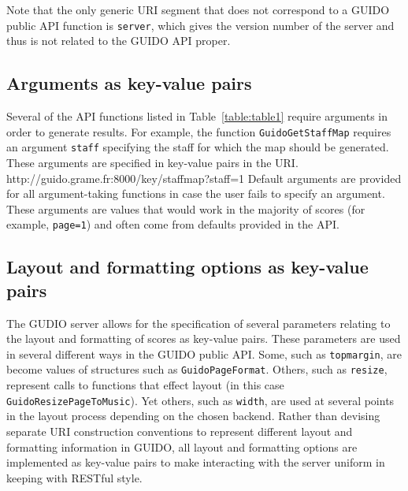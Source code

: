 \documentclass[11pt,a4paper]{article}
\newenvironment{code}		{\vspace{-2mm} \fontsize{8.5pt}{12pt}\selectfont \verbatim}{\endverbatim\vspace{-2mm}}
\begin{document}
Note that the only generic URI segment that does not correspond to a GUIDO public API function is \verb=server=, which gives the version number of the server and thus is not related to the GUIDO API proper.


\subsection{Arguments as key-value pairs}
Several of the API functions listed in Table~\ref{table:table1} require arguments in order to generate results.  For example, the function \verb=GuidoGetStaffMap= requires an argument \verb=staff= specifying the staff for which the map should be generated.  These arguments are specified in key-value pairs in the URI.
\begin{code}
 http://guido.grame.fr:8000/key/staffmap?staff=1
\end{code}
Default arguments are provided for all argument-taking functions in case the user fails to specify an argument.  These arguments are values that would work in the majority of scores (for example, \verb&page=1&) and often come from defaults provided in the API.
\subsection{Layout and formatting options as key-value pairs}
The GUDIO server allows for the specification of several parameters relating to the layout and formatting of scores as key-value pairs.  These parameters are used in several different ways in the GUIDO public API.  Some, such as \verb=topmargin=, are become values of structures such as \verb=GuidoPageFormat=.  Others, such as \verb=resize=, represent calls to functions that effect layout (in this case \break \verb=GuidoResizePageToMusic=).  Yet others, such as \break \verb=width=, are used at several points in the layout process depending on the chosen backend.  Rather than devising separate URI construction conventions to represent different layout and formatting information in GUIDO, all layout and formatting options are implemented as key-value pairs to make interacting with the server uniform in keeping with RESTful style.\par
\end{document}
